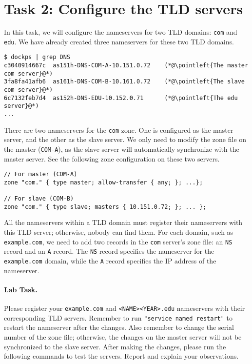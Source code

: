 \section{Task 2: Configure the TLD servers}


In this task, we will configure the nameservers for two TLD domains:
\texttt{com} and \texttt{edu}. We have already created
three nameservers for these two TLD domains. 

\begin{lstlisting}
$ dockps | grep DNS
c3040914667c  as151h-DNS-COM-A-10.151.0.72    (*@\pointleft{The master com server}@*) 
3fa8fa41afb6  as161h-DNS-COM-B-10.161.0.72    (*@\pointleft{The slave com server}@*)
6c7132feb7d4  as152h-DNS-EDU-10.152.0.71      (*@\pointleft{The edu server}@*)
...
\end{lstlisting}
 
There are two nameservers for the \texttt{com} zone. One is configured as 
the master server, and the other as the slave server. 
We only need to modify the zone file on the master (\texttt{COM-A}), 
as the slave server will automatically synchronize 
with the master server. See the following zone configuration
on these two servers. 

\begin{lstlisting}
// For master (COM-A)
zone "com." { type master; allow-transfer { any; }; ...};

// For slave (COM-B)
zone "com." { type slave; masters { 10.151.0.72; }; ... };
\end{lstlisting}


All the nameservers within a TLD domain
must register their nameservers with this
TLD server; otherwise, nobody can find them. 
For each domain, such as \texttt{example.com},  
we need to add two records in the \texttt{com} server's
zone file: an \texttt{NS} record and an \texttt{A} record.
The \texttt{NS} record specifies the nameserver for the
\texttt{example.com} domain, while the \texttt{A} record
specifies the IP address of the nameserver. 


\paragraph{Lab Task.}
Please register your \texttt{example.com} and \texttt{<NAME><YEAR>.edu} 
nameservers with their corresponding TLD servers. Remember to run
\texttt{"service named restart"}  to restart the nameserver after the
changes. Also remember to change the serial number of the zone file; otherwise,
the changes on the master server will not be synchronized to the 
slave server. After making the changes, please run the following commands
to test the servers. 
Report and explain your observations. 

